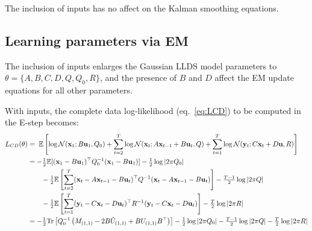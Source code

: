 \documentclass[10pt]{article}
\newcommand{\vx}{\mathbf{x}}
\newcommand{\vy}{\mathbf{y}}
\newcommand{\vu}{\mathbf{u}}
\begin{document}
\begin{appendices}
The inclusion of inputs has no affect on the Kalman smoothing
equations.



\subsection{Learning parameters via EM}

The inclusion of inputs enlarges the Gaussian LLDS model parameters to $\theta =
\{A,B,C,D, Q, Q_0, R\}$, and the presence of $B$ and $D$ affect the
EM update equations for all other parameters. 

With inputs, the complete data log-likelihood (eq.~\ref{eq:LCD})
to be computed in the E-step becomes:
\begin{align}
  \label{eq:LCD2}
L_{CD}(\theta) &=  \; \E \left[ \log \Nrm(\vx_1; B\vu_1, Q_0) + \sum_{t=2}^{T} \log \Nrm(\vx_{t};
                  A\vx_{t-1} +B\vu_t,  Q) +  \sum_{t=1}^T \log \Nrm(\vy_t ; C\vx_t+D\vu,R) \right] 
  \\
               &=  -\tonehlf \E [(\vx_1-B\vu_1)\trp
                                              Q_0\inv (\vx_1-B\vu_1)]  -
                                              \tonehlf \log |2\pi Q_0|
                                              \nonumber \\
    & \qquad             - \tonehlf \E\left[ \sum_{t=2}^{T} (\vx_{t} - A
      \vx_{t-1}-B\vu_{t})\trp Q\inv (\vx_{t} - A\vx_{t-1}-B\vu_{t}) \right] -\tfrac{T-1}{2} \log |2\pi Q| \nonumber \\
    & \qquad - \tonehlf \E\left[\sum_{t=1}^T (\vy_t - C
    \vx_t-D\vu_{t})\trp R\inv (\vy_t - C\vx_t-D\vu_{t}) \right]
      -\tfrac{T}{2} \log |2\pi R| \\
               & =
                  - \tonehlf \Tr\left[Q_0\inv \left(M_{(1,1)} 
                 -2  B \tilde U_{(1,1)}
                 + B U_{(1,1)} B\trp 
                 \right)\right]
                  -\tfrac{1}{2} \log |2\pi Q_0|
                 -\tfrac{T-1}{2} \log |2\pi Q|
                 -\tfrac{T}{2} \log |2\pi R|
                 \nonumber \\

\end{align}
\end{appendices}
\end{document}
